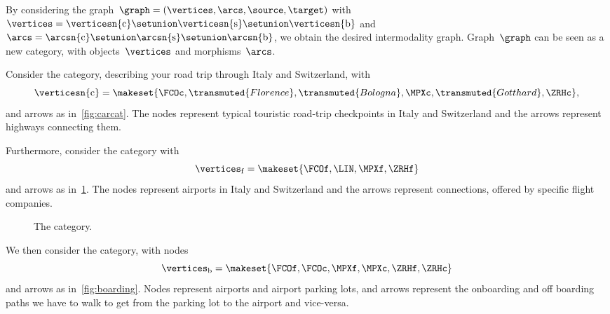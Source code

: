 By considering the graph~$\graph=(\vertices,\arcs,\source,\target)$ with~$\vertices=\verticesn{\mathrm{c}}\setunion \verticesn{\mathrm{s}}\setunion \verticesn{\mathrm{b}}$ and~$\arcs=\arcsn{\mathrm{c}}\setunion \arcsn{\mathrm{s}}\setunion \arcsn{\mathrm{b}}$, we obtain the desired intermodality graph.
Graph~$\graph$ can be seen as a new category, with objects~$\vertices$ and morphisms~$\arcs$.
\begin{example}
    \label{exa:car-category}
    Consider the \Car category, describing your road trip through Italy and Switzerland, with
    \begin{equation}
        \verticesn{\mathrm{c}}=
        \makeset{
            \FCOc,
            \transmuted{Florence},
            \transmuted{Bologna},
            \MPXc,
            \transmuted{Gotthard},
            \ZRHc
        },
    \end{equation}
    and arrows as in~\cref{fig:carcat}.
    The nodes represent typical touristic road-trip checkpoints in Italy and Switzerland and the arrows represent highways connecting them.

    \begin{figure*}[h!]
        \caption{The \Car category.}
        \label{fig:carcat}
    \end{figure*}

    Furthermore, consider the \Flight category with
    \begin{equation}
        \vertices_\mathrm{f}
        = \makeset{
            \FCOf,
            \LIN,
            \MPXf,
            \ZRHf
        }
    \end{equation}
    and arrows as in~\cref{fig:flight}.
    The nodes represent airports in Italy and Switzerland and the arrows represent connections, offered by specific flight companies.

    \begin{figure}[h!]
        \centering
        \caption{The \Flight category.}
        \label{fig:flight}
    \end{figure}

    We then consider the \Board category, with nodes
    \begin{equation}
        \vertices_\mathrm{b}=\makeset{\FCOf,\FCOc,\MPXf,\MPXc,\ZRHf,\ZRHc}
    \end{equation}
    and arrows as in~\cref{fig:boarding}.
    Nodes represent airports and airport parking lots, and arrows represent the onboarding and off boarding paths we have to walk to get from the parking lot to the airport and vice-versa.


\end{example}

